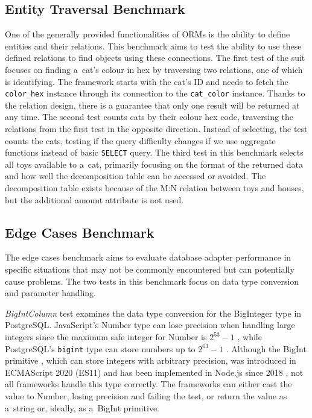 \subsection*{Entity Traversal Benchmark}
One of the generally provided functionalities of ORMs is the ability to define
entities and their relations. This benchmark aims to test the ability to use
these defined relations to find objects using these connections. The first test
of the suit focuses on finding a~cat's colour in hex by traversing two
relations, one of which is identifying. The framework starts with the cat's ID
and needs to fetch the \texttt{color\_hex} instance through its connection to
the \texttt{cat\_color} instance. Thanks to the relation design, there is a
guarantee that only one result will be returned at any time. The second test
counts cats by their colour hex code, traversing the relations from the first
test in the opposite direction. Instead of selecting, the test counts the cats,
testing if the query difficulty changes if we use aggregate functions instead of
basic \texttt{SELECT} query. The third test in this benchmark selects all toys
available to a~cat, primarily focusing on the format of the returned data and
how well the decomposition table can be accessed or avoided. The decomposition
table exists because of the M:N relation between toys and houses, but the
additional amount attribute is not used.

\subsection*{Edge Cases Benchmark}

The edge cases benchmark aims to evaluate database adapter performance in
specific situations that may not be commonly encountered but can potentially
cause problems. The two tests in this benchmark focus on data type conversion
and parameter handling.

\textit{BigIntColumn} test examines the data type conversion for the BigInteger
type in PostgreSQL. JavaScript's Number type can lose precision when handling
large integers since the maximum safe integer for Number is \(2^{53} - 1\)
\cite{MDNNumber}, while PostgreSQL's \texttt{bigint} type can store numbers up
to \(2^{63} - 1\) \cite{PostgresNumeric}. Although the BigInt primitive
\cite{MDNBigInt}, which can store integers with arbitrary precision, was
introduced in ECMAScript 2020 (ES11) \cite{ecma-262} and has been implemented in
Node.js since 2018 \cite{MDNBigInt}, not all frameworks handle this type
correctly. The frameworks can either cast the value to Number, losing precision
and failing the test, or return the value as a~string or, ideally, as a~BigInt
primitive.

